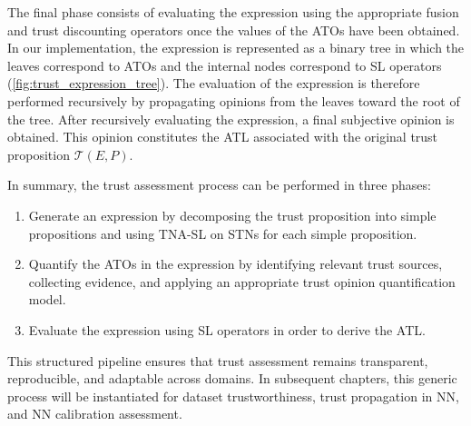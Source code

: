 The final phase consists of evaluating the expression using the appropriate fusion and trust discounting operators once the values of the \acp{ATO} have been obtained. In our implementation, the expression is represented as a binary tree in which the leaves correspond to \acp{ATO} and the internal nodes correspond to \ac{SL} operators (\cref{fig:trust_expression_tree}). The evaluation of the expression is therefore performed recursively by propagating opinions from the leaves toward the root of the tree. After recursively evaluating the expression, a final subjective opinion is obtained. This opinion constitutes the \ac{ATL} associated with the original trust proposition $\mathcal{T}(E, P)$.


In summary, the trust assessment process can be performed in three phases:
\begin{enumerate}
    \item Generate an expression by decomposing the trust proposition into simple propositions and using \ac{TNA-SL} on \acp{STN} for each simple proposition.
    \item Quantify the \acp{ATO} in the expression by identifying relevant trust sources, collecting evidence, and applying an appropriate trust opinion quantification model.    
    \item Evaluate the expression using \ac{SL} operators in order to derive the \ac{ATL}.
\end{enumerate}

This structured pipeline ensures that trust assessment remains transparent, reproducible, and adaptable across domains. In subsequent chapters, this generic process will be instantiated for dataset trustworthiness, trust propagation in \ac{NN}, and \ac{NN} calibration assessment.
